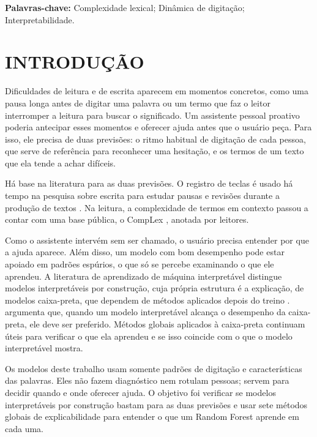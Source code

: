 \documentclass[12pt,a4paper]{article}
\begin{document}
\vspace{\baselineskip}
\noindent\textbf{Palavras-chave:} Complexidade lexical; Dinâmica de digitação;
Interpretabilidade.

\section{INTRODUÇÃO}

Dificuldades de leitura e de escrita aparecem em momentos concretos, como uma
pausa longa antes de digitar uma palavra ou um termo que faz o leitor
interromper a leitura para buscar o significado. Um assistente pessoal
proativo poderia antecipar esses momentos e oferecer ajuda antes que o usuário
peça. Para isso, ele precisa de duas previsões: o ritmo habitual de digitação
de cada pessoa, que serve de referência para reconhecer uma hesitação, e os
termos de um texto que ela tende a achar difíceis.

Há base na literatura para as duas previsões. O registro de teclas é usado há
tempo na pesquisa sobre escrita para estudar pausas e revisões durante a
produção de textos \citep{leijten2013}.
Na leitura, a complexidade de termos em contexto passou a contar com uma base
pública, o CompLex \citep{shardlow2020}, anotada por leitores.

Como o assistente intervém sem ser chamado, o usuário precisa entender por que
a ajuda aparece. Além disso, um modelo com bom desempenho pode estar apoiado em
padrões espúrios, o que só se percebe examinando o que ele aprendeu. A literatura de
aprendizado de máquina interpretável distingue modelos interpretáveis por
construção, cuja própria estrutura é a explicação, de modelos caixa-preta, que
dependem de métodos aplicados depois do treino \citep{molnar2022}.
\citet{rudin2019} argumenta que, quando um modelo interpretável alcança o
desempenho da caixa-preta, ele deve ser preferido. Métodos globais aplicados à
caixa-preta continuam úteis para verificar o que ela aprendeu e se isso
coincide com o que o modelo interpretável mostra.

Os modelos deste trabalho usam somente padrões de digitação e características
das palavras. Eles não fazem diagnóstico nem rotulam pessoas; servem para
decidir quando e onde oferecer ajuda. O objetivo foi verificar se modelos
interpretáveis por construção bastam para as duas previsões e usar sete
métodos globais de explicabilidade para entender o que um Random Forest
aprende em cada uma.
\end{document}
